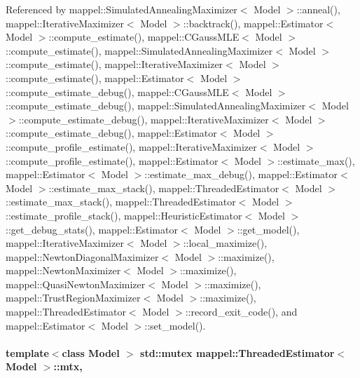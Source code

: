 Referenced by mappel\+::\+Simulated\+Annealing\+Maximizer$<$ Model $>$\+::anneal(), mappel\+::\+Iterative\+Maximizer$<$ Model $>$\+::backtrack(), mappel\+::\+Estimator$<$ Model $>$\+::compute\+\_\+estimate(), mappel\+::\+C\+Gauss\+M\+L\+E$<$ Model $>$\+::compute\+\_\+estimate(), mappel\+::\+Simulated\+Annealing\+Maximizer$<$ Model $>$\+::compute\+\_\+estimate(), mappel\+::\+Iterative\+Maximizer$<$ Model $>$\+::compute\+\_\+estimate(), mappel\+::\+Estimator$<$ Model $>$\+::compute\+\_\+estimate\+\_\+debug(), mappel\+::\+C\+Gauss\+M\+L\+E$<$ Model $>$\+::compute\+\_\+estimate\+\_\+debug(), mappel\+::\+Simulated\+Annealing\+Maximizer$<$ Model $>$\+::compute\+\_\+estimate\+\_\+debug(), mappel\+::\+Iterative\+Maximizer$<$ Model $>$\+::compute\+\_\+estimate\+\_\+debug(), mappel\+::\+Estimator$<$ Model $>$\+::compute\+\_\+profile\+\_\+estimate(), mappel\+::\+Iterative\+Maximizer$<$ Model $>$\+::compute\+\_\+profile\+\_\+estimate(), mappel\+::\+Estimator$<$ Model $>$\+::estimate\+\_\+max(), mappel\+::\+Estimator$<$ Model $>$\+::estimate\+\_\+max\+\_\+debug(), mappel\+::\+Estimator$<$ Model $>$\+::estimate\+\_\+max\+\_\+stack(), mappel\+::\+Threaded\+Estimator$<$ Model $>$\+::estimate\+\_\+max\+\_\+stack(), mappel\+::\+Threaded\+Estimator$<$ Model $>$\+::estimate\+\_\+profile\+\_\+stack(), mappel\+::\+Heuristic\+Estimator$<$ Model $>$\+::get\+\_\+debug\+\_\+stats(), mappel\+::\+Estimator$<$ Model $>$\+::get\+\_\+model(), mappel\+::\+Iterative\+Maximizer$<$ Model $>$\+::local\+\_\+maximize(), mappel\+::\+Newton\+Diagonal\+Maximizer$<$ Model $>$\+::maximize(), mappel\+::\+Newton\+Maximizer$<$ Model $>$\+::maximize(), mappel\+::\+Quasi\+Newton\+Maximizer$<$ Model $>$\+::maximize(), mappel\+::\+Trust\+Region\+Maximizer$<$ Model $>$\+::maximize(), mappel\+::\+Threaded\+Estimator$<$ Model $>$\+::record\+\_\+exit\+\_\+code(), and mappel\+::\+Estimator$<$ Model $>$\+::set\+\_\+model().

\paragraph[{\texorpdfstring{mtx}{mtx}}]{\setlength{\rightskip}{0pt plus 5cm}template$<$class Model $>$ std\+::mutex {\bf mappel\+::\+Threaded\+Estimator}$<$ Model $>$\+::mtx\hspace{0.3cm}{\ttfamily [protected]}, {\ttfamily [inherited]}}\hypertarget{classmappel_1_1ThreadedEstimator_a4538fd0860243430bfd47e8064c8cfe4}{}\label{classmappel_1_1ThreadedEstimator_a4538fd0860243430bfd47e8064c8cfe4}


